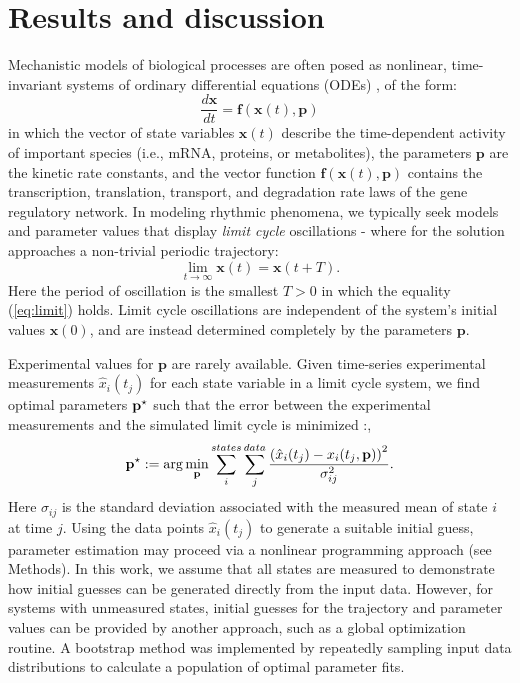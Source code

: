 \section{Results and discussion}
Mechanistic models of biological processes are often posed as
nonlinear, time-invariant systems of ordinary differential equations (ODEs)
\cite{Leloup2003, Forger2003, Mirsky2009}, of the form:
\begin{equation}
  \frac{d{\bm x}}{dt} = {\bm f}({\bm x}(t), {\bm p})
\end{equation}
in which the vector of state variables ${\bm x}(t)$ describe the time-dependent
activity of important species (i.e., mRNA, proteins, or metabolites), the
parameters $\bm p$ are the kinetic rate constants, and the vector function
${\bm f}({\bm x}(t), {\bm p})$ contains the transcription, translation,
transport, and degradation rate laws of the gene regulatory network. In
modeling rhythmic phenomena, we typically seek models and parameter values that
display {\itshape limit cycle} oscillations - where for the solution
approaches a non-trivial periodic trajectory:
\begin{equation} \label{eq:limit}
  \lim_{t \rightarrow \infty} {\bm x}(t) = {\bm x}(t + T).
\end{equation}
Here the period of oscillation is the smallest $T > 0$ in which the equality
(\ref{eq:limit}) holds. Limit cycle oscillations are independent of the
system's initial values ${\bm x}(0)$, and are instead determined completely by
the parameters $\bm p$. 

Experimental values for $\bm p$ are rarely available. Given time-series
experimental measurements $\hat{x}_i(t_j)$ for each state variable in a limit
cycle system, we find optimal parameters ${\mathbf{p}}^\star$ such that the error between
the experimental measurements and the simulated limit cycle is minimized
\cite{Bock2007}:,
\begin{equation} \label{eq:cost1}
{\mathbf{p}}^\star := \arg\min_{\mathbf{p}} \sum_i^{states} \sum_j^{data}
\frac{\left(\hat{x}_i(t_j) - x_i(t_j,{\mathbf{p}})\right)^2}{ {\sigma}_{ij}^2}.
\end{equation}
Here ${\sigma}_{ij}$ is the standard deviation associated with the measured
mean of state $i$ at time $j$. Using the data points $\hat{x}_i(t_j)$ to
generate a suitable initial guess, parameter estimation may proceed via a
nonlinear programming approach (see Methods). In this work, we assume
that all states are measured to demonstrate how initial guesses can be
generated directly from the input data. However, for systems with unmeasured
states, initial guesses for the trajectory and parameter values can 
be provided by another approach, such as a global optimization routine. A
bootstrap method was implemented by repeatedly sampling input data
distributions to calculate a population of optimal parameter fits.

